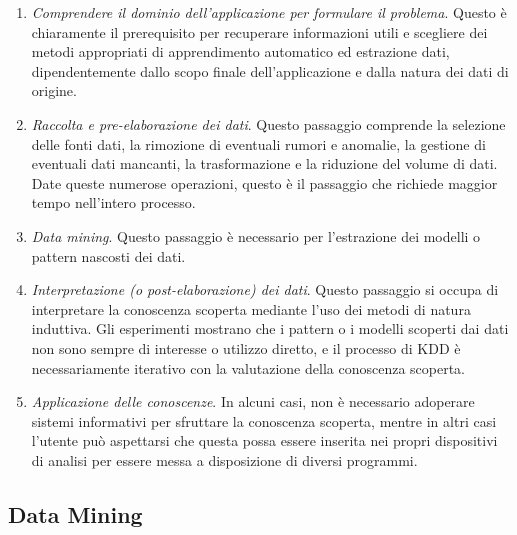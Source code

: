\begin{enumerate}
    \item \textit{Comprendere il dominio dell'applicazione per formulare il problema}. Questo è chiaramente il prerequisito per recuperare informazioni utili e scegliere dei metodi appropriati di apprendimento automatico ed estrazione dati, dipendentemente dallo scopo finale dell'applicazione e dalla natura dei dati di origine.
    \item \textit{Raccolta e pre-elaborazione dei dati}. Questo passaggio comprende la selezione delle fonti dati, la rimozione di eventuali rumori e anomalie, la gestione di eventuali dati mancanti, la trasformazione e la riduzione del volume di dati. Date queste numerose operazioni, questo è il passaggio che richiede maggior tempo nell'intero processo.
    \item \textit{Data mining}. Questo passaggio è necessario per l'estrazione dei modelli o pattern nascosti dei dati.
    \item \textit{Interpretazione (o post-elaborazione) dei dati}. Questo passaggio si occupa di interpretare la conoscenza scoperta mediante l'uso dei metodi di natura induttiva. Gli esperimenti mostrano che i pattern o i modelli scoperti dai dati non sono sempre di interesse o utilizzo diretto, e il processo di KDD è necessariamente iterativo con la valutazione della conoscenza scoperta.
    \item \textit{Applicazione delle conoscenze}. In alcuni casi, non è necessario adoperare sistemi informativi per sfruttare la conoscenza scoperta, mentre in altri casi l'utente può aspettarsi che questa possa essere inserita nei propri dispositivi di analisi per essere messa a disposizione di diversi programmi.
\end{enumerate}

\subsection{Data Mining}

